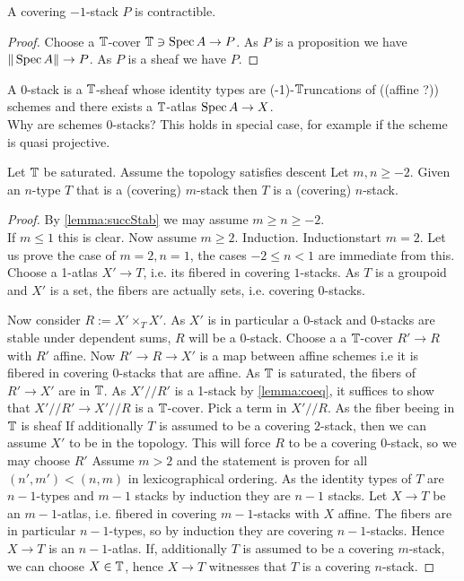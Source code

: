 \documentclass{article}
\newcommand{\affineA}{(affine ?)}
\newcommand{\truncation}{$\bT$runcation}
\newcommand{\red}[1]{{\color{red} #1}}
\begin{document}
\begin{lemma}
    A covering $-1$-stack $P$ is contractible.
\end{lemma}
\begin{proof}
    Choose a $\mathbb{T}$-cover $\mathbb{T} \ni \operatorname{Spec} A \to P$. As $P$ is a proposition we have $\| \operatorname{Spec} A\| \to P$. As $P$ is a sheaf we have $P$.
\end{proof}
\begin{example}
    A  0-stack is a $\mathbb{T}$-sheaf whose identity types are \red{(-1)-\truncation s of} (\affineA) schemes and there exists a $\mathbb{T}$-atlas $\operatorname{Spec} A \to X$. \\
    Why are schemes  0-stacks? This holds in special case, for example if the scheme is quasi projective. 
\end{example}
\begin{theorem}{\label{thm:stack}}
    Let $\mathbb{T}$ be saturated. Assume the topology satisfies descent Let $m , n \ge -2$. Given an $n$-type $T$ that is a  (covering) $m$-stack then $T$ is a  (covering) $n$-stack.
\end{theorem}


\begin{proof}
    
    By \ref{lemma:succStab} we may assume $m \ge n \ge -2$. \\
    If $m \le 1$ this is clear. Now assume $m \ge 2$. 
    Induction. 
    Inductionstart $m = 2$. Let us prove the case of $m = 2,n=1$, the cases $-2 \le n<1$ are immediate from this. \\
    Choose a 1-atlas $X' \to T$, i.e. its fibered in covering $1$-stacks. As $T$ is a groupoid and $X'$ is a set, the fibers are actually sets, i.e. covering 0-stacks. 
    
    Now consider $R := X' \times_T X'$. As $X'$ is in particular a  0-stack and  0-stacks are stable under dependent sums, $R$ will be a  0-stack. Choose a  a $\mathbb{T}$-cover $R' \to R$ with $R'$ affine. Now $R' \to R \to X'$ is a map between affine schemes i.e it is fibered in covering 0-stacks that are affine. As $\mathbb{T}$ is saturated, the fibers of $R' \to X'$ are in $\mathbb{T}$. As $X' // R'$ is a  1-stack by \ref{lemma:coeq}, it suffices to show that $X' // R' \to X' // R$ is a $\mathbb{T}$-cover. Pick a term in $X' // R$. As the fiber beeing in $\mathbb{T}$ is sheaf 
    If additionally $T$ is assumed to be a covering $2$-stack, then we can assume $X'$ to be in the topology. This will force $R$ to be a covering $0$-stack, so we may choose $R'$
    Assume $m > 2$ and the statement is proven for all $(n',m') < (n,m)$ in lexicographical ordering. As the identity types of $T$ are $n-1$-types and  $m-1$ stacks by induction they are  $n-1$ stacks. Let $X \to T$ be an $m-1$-atlas, i.e. fibered in covering $m-1$-stacks with $X$ affine. The fibers are in particular $n-1$-types, so by induction they are covering $n-1$-stacks. Hence $X \to T$ is an $n-1$-atlas. If, additionally $T$ is assumed to be a covering $m$-stack, we can choose $X \in \mathbb{T}$, hence $X \to T$ witnesses that $T$ is a covering $n$-stack.
    
\end{proof}
\end{document}
